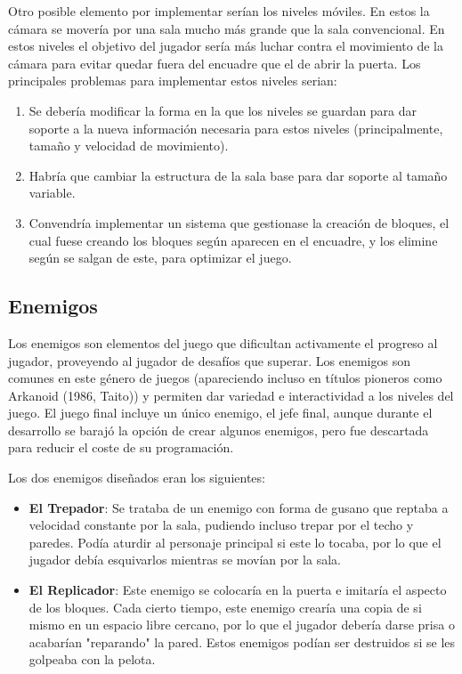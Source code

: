 Otro posible elemento por implementar serían los niveles móviles. En estos la cámara se movería por una sala mucho más grande que la sala convencional. En estos niveles el objetivo del jugador sería más luchar contra el movimiento de la cámara para evitar quedar fuera del encuadre que el de abrir la puerta. Los principales problemas para implementar estos niveles serian:
\begin{enumerate}
\item Se debería modificar la forma en la que los niveles se guardan para dar soporte a la nueva información necesaria para estos niveles (principalmente, tamaño y velocidad de movimiento).  
\item Habría que cambiar la estructura de la sala base para dar soporte al tamaño variable.
\item Convendría implementar un sistema que gestionase la creación de bloques, el cual fuese creando los bloques según aparecen en el encuadre, y los elimine según se salgan de este, para optimizar el juego.
\end{enumerate}

\subsection{Enemigos}
Los enemigos son elementos del juego que dificultan activamente el progreso al jugador, proveyendo al jugador de desafíos que superar\cite{game_design_patterns}. Los enemigos son comunes en este género de juegos (apareciendo incluso en títulos pioneros como Arkanoid (1986, Taito)) y permiten dar variedad e interactividad a los niveles del juego. El juego final incluye un único enemigo, el jefe final, aunque durante el desarrollo se barajó la opción de crear algunos enemigos, pero fue descartada para reducir el coste de su programación.

Los dos enemigos diseñados eran los siguientes:
\begin{itemize}
\item \textbf{El Trepador}: Se trataba de un enemigo con forma de gusano que reptaba a velocidad constante por la sala, pudiendo incluso trepar por el techo y paredes. Podía aturdir al personaje principal si este lo tocaba, por lo que el jugador debía esquivarlos mientras se movían por la sala.
\item \textbf{El Replicador}: Este enemigo se colocaría en la puerta e imitaría el aspecto de los bloques. Cada cierto tiempo, este enemigo crearía una copia de si mismo en un espacio libre cercano, por lo que el jugador debería darse prisa o acabarían "reparando" la pared. Estos enemigos podían ser destruidos si se les golpeaba con la pelota.
\end{itemize}

